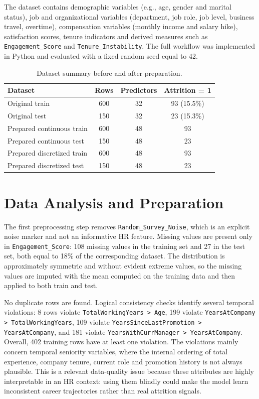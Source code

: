 \documentclass[lettersize,journal]{IEEEtran}
\begin{document}
The dataset contains demographic variables (e.g., age, gender and marital status), job and organizational variables (department, job role, job level, business travel, overtime), compensation variables (monthly income and salary hike), satisfaction scores, tenure indicators and derived measures such as \texttt{Engagement\_Score} and \texttt{Tenure\_Instability}. The full workflow was implemented in Python and evaluated with a fixed random seed equal to 42.

\begin{table}[t]
\caption{Dataset summary before and after preparation.}
\label{tab:dataset}
\centering
\scriptsize
\setlength{\tabcolsep}{3pt}
\begin{tabular}{lccc}
\toprule
Dataset & Rows & Predictors & Attrition = 1 \\
\midrule
Original train & 600 & 32 & 93 (15.5\%) \\
Original test  & 150 & 32 & 23 (15.3\%) \\
Prepared continuous train & 600 & 48 & 93 \\
Prepared continuous test  & 150 & 48 & 23 \\
Prepared discretized train & 600 & 48 & 93 \\
Prepared discretized test  & 150 & 48 & 23 \\
\bottomrule
\end{tabular}
\end{table}

\section{Data Analysis and Preparation}
The first preprocessing step removes \texttt{Random\_Survey\_Noise}, which is an explicit noise marker and not an informative HR feature. Missing values are present only in \texttt{Engagement\_Score}: 108 missing values in the training set and 27 in the test set, both equal to 18\% of the corresponding dataset. The distribution is approximately symmetric and without evident extreme values, so the missing values are imputed with the mean computed on the training data and then applied to both train and test.

No duplicate rows are found. Logical consistency checks identify several temporal violations: 8 rows violate \texttt{TotalWorkingYears > Age}, 199 violate \texttt{YearsAtCompany > TotalWorkingYears}, 109 violate \texttt{YearsSinceLastPromotion > YearsAtCompany}, and 181 violate \texttt{YearsWithCurrManager > YearsAtCompany}. Overall, 402 training rows have at least one violation. The violations mainly concern temporal seniority variables, where the internal ordering of total experience, company tenure, current role and promotion history is not always plausible. This is a relevant data-quality issue because these attributes are highly interpretable in an HR context: using them blindly could make the model learn inconsistent career trajectories rather than real attrition signals.
\end{document}
